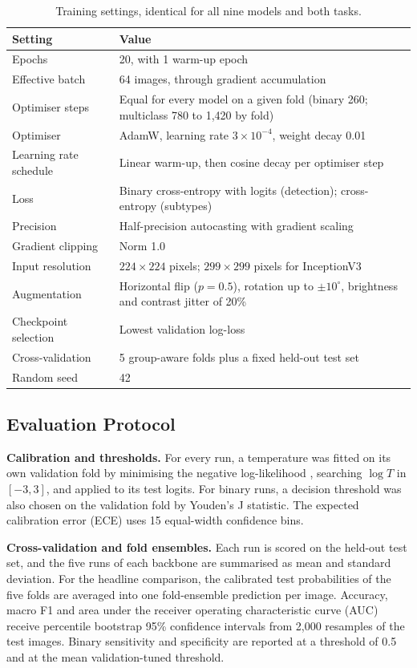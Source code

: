 \documentclass[final,3p,times,number]{elsarticle}
\begin{document}
\begin{table}[htbp]
\centering
\caption{Training settings, identical for all nine models and both tasks.}
\label{tab:hyperparams}
\small
\begin{tabularx}{\textwidth}{@{}lY@{}}
\toprule
Setting & Value \\
\midrule
Epochs & 20, with 1 warm-up epoch \\
Effective batch & 64 images, through gradient accumulation \\
Optimiser steps & Equal for every model on a given fold (binary 260; multiclass 780 to 1,420 by fold) \\
Optimiser & AdamW, learning rate $3\times 10^{-4}$, weight decay 0.01 \\
Learning rate schedule & Linear warm-up, then cosine decay per optimiser step \\
Loss & Binary cross-entropy with logits (detection); cross-entropy (subtypes) \\
Precision & Half-precision autocasting with gradient scaling \\
Gradient clipping & Norm 1.0 \\
Input resolution & $224\times 224$ pixels; $299\times 299$ pixels for InceptionV3 \\
Augmentation & Horizontal flip ($p=0.5$), rotation up to $\pm 10^{\circ}$, brightness and contrast jitter of 20\% \\
Checkpoint selection & Lowest validation log-loss \\
Cross-validation & 5 group-aware folds plus a fixed held-out test set \\
Random seed & 42 \\
\bottomrule
\end{tabularx}
\end{table}

\subsection{Evaluation Protocol}
\label{sec:evaluation}

\textbf{Calibration and thresholds.} For every run, a temperature was fitted on its own validation fold by minimising the negative log-likelihood \cite{guo2017}, searching $\log T$ in $[-3, 3]$, and applied to its test logits. For binary runs, a decision threshold was also chosen on the validation fold by Youden's J statistic. The expected calibration error (ECE) uses 15 equal-width confidence bins.

\textbf{Cross-validation and fold ensembles.} Each run is scored on the held-out test set, and the five runs of each backbone are summarised as mean and standard deviation. For the headline comparison, the calibrated test probabilities of the five folds are averaged into one fold-ensemble prediction per image. Accuracy, macro F1 and area under the receiver operating characteristic curve (AUC) receive percentile bootstrap 95\% confidence intervals from 2,000 resamples of the test images. Binary sensitivity and specificity are reported at a threshold of 0.5 and at the mean validation-tuned threshold.
\end{document}

